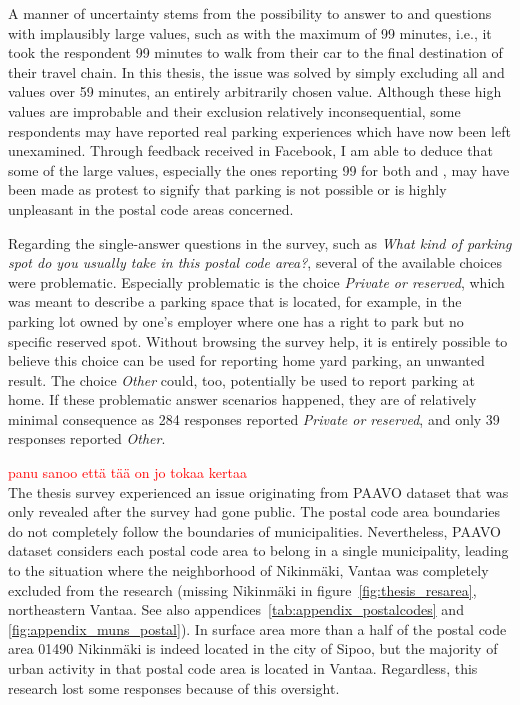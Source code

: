 A manner of uncertainty stems from the possibility to answer to  and  questions with implausibly large values, such as with the maximum of 99 minutes, i.e., it took the respondent 99 minutes to walk from their car to the final destination of their travel chain. In this thesis, the issue was solved by simply excluding all  and  values over 59 minutes, an entirely arbitrarily chosen value. Although these high values are improbable and their exclusion relatively inconsequential, some respondents may have reported real parking experiences which have now been left unexamined. Through feedback received in Facebook, I am able to deduce that some of the large values, especially the ones reporting 99 for both  and , may have been made as protest to signify that parking is not possible or is highly unpleasant in the postal code areas concerned.

Regarding the single-answer questions in the survey, such as \textit{What kind of parking spot do you usually take in this postal code area?}, several of the available choices were problematic. Especially problematic is the choice \textit{Private or reserved}, which was meant to describe a parking space that is located, for example, in the parking lot owned by one's employer where one has a right to park but no specific reserved spot. Without browsing the survey help, it is entirely possible to believe this choice can be used for reporting home yard parking, an unwanted result. The choice \textit{Other} could, too, potentially be used to report parking at home. If these problematic  answer scenarios happened, they are of relatively minimal consequence as 284 responses reported \textit{Private or reserved}, and only 39 responses reported \textit{Other}.

\textcolor{red}{panu sanoo että tää on jo tokaa kertaa} \\
The thesis survey experienced an issue originating from PAAVO dataset that was only revealed after the survey had gone public. The postal code area boundaries do not completely follow the boundaries of municipalities. Nevertheless, PAAVO dataset considers each postal code area to belong in a single municipality, leading to the situation where the neighborhood of Nikinmäki, Vantaa was completely excluded from the research (missing Nikinmäki in figure~\ref{fig:thesis_resarea}, northeastern Vantaa. See also appendices~\ref{tab:appendix_postalcodes} and \ref{fig:appendix_muns_postal}). In surface area more than a half of the postal code area 01490 Nikinmäki is indeed located in the city of Sipoo, but the majority of urban activity in that postal code area is located in Vantaa. Regardless, this research lost some responses because of this oversight.

